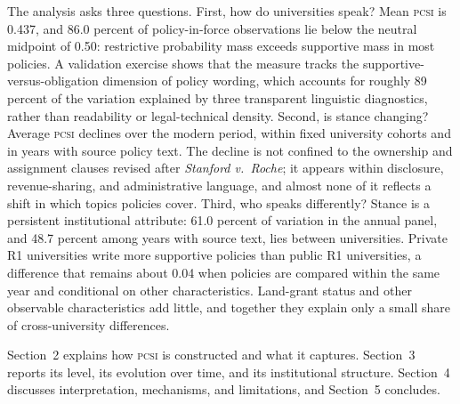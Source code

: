 The analysis asks three questions. First, how do universities speak? Mean \textsc{pcsi} is 0.437, and 86.0 percent of policy-in-force observations lie below the neutral midpoint of 0.50: restrictive probability mass exceeds supportive mass in most policies. A validation exercise shows that the measure tracks the supportive-versus-obligation dimension of policy wording, which accounts for roughly 89 percent of the variation explained by three transparent linguistic diagnostics, rather than readability or legal-technical density. Second, is stance changing? Average \textsc{pcsi} declines over the modern period, within fixed university cohorts and in years with source policy text. The decline is not confined to the ownership and assignment clauses revised after \emph{Stanford v.\ Roche}; it appears within disclosure, revenue-sharing, and administrative language, and almost none of it reflects a shift in which topics policies cover. Third, who speaks differently? Stance is a persistent institutional attribute: 61.0 percent of variation in the annual panel, and 48.7 percent among years with source text, lies between universities. Private R1 universities write more supportive policies than public R1 universities, a difference that remains about 0.04 when policies are compared within the same year and conditional on other characteristics. Land-grant status and other observable characteristics add little, and together they explain only a small share of cross-university differences.


Section~2 explains how \textsc{pcsi} is constructed and what it captures. Section~3 reports its level, its evolution over time, and its institutional structure. Section~4 discusses interpretation, mechanisms, and limitations, and Section~5 concludes.


%


